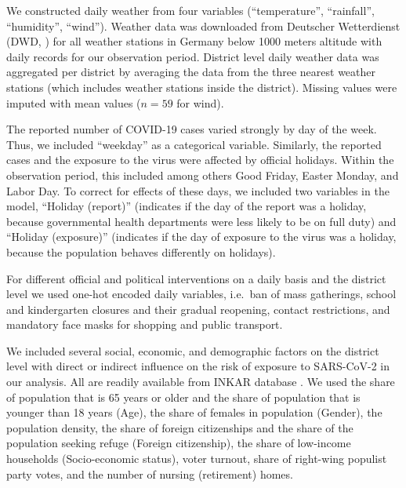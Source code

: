 \documentclass[]{elsarticle} %
\begin{document}
We constructed daily weather from four variables (``temperature'', ``rainfall'', ``humidity'', ``wind''). Weather data was downloaded from Deutscher Wetterdienst (DWD, \citep{dwd_weather}) for all weather stations in Germany below 1000 meters altitude with daily records for our observation period. District level daily weather data was aggregated per district by averaging the data from the three nearest weather stations (which includes weather stations inside the district). Missing values were imputed with mean values (\(n=59\) for wind).

The reported number of COVID-19 cases varied strongly by day of the week. Thus, we included ``weekday'' as a categorical variable. Similarly, the reported cases and the exposure to the virus were affected by official holidays. Within the observation period, this included among others Good Friday, Easter Monday, and Labor Day. To correct for effects of these days, we included two variables in the model, ``Holiday (report)'' (indicates if the day of the report was a holiday, because governmental health departments were less likely to be on full duty) and ``Holiday (exposure)'' (indicates if the day of exposure to the virus was a holiday, because the population behaves differently on holidays).

For different official and political interventions on a daily basis and the district level we used one-hot encoded daily variables, i.e.~ban of mass gatherings, school and kindergarten closures and their gradual reopening, contact restrictions, and mandatory face masks for shopping and public transport.

We included several social, economic, and demographic factors on the district level with direct or indirect influence on the risk of exposure to SARS-CoV-2 in our analysis. All are readily available from INKAR database \citep{inkar}. We used the share of population that is 65 years or older and the share of population that is younger than 18 years (Age), the share of females in population (Gender), the population density, the share of foreign citizenships and the share of the population seeking refuge (Foreign citizenship), the share of low-income households (Socio-economic status), voter turnout, share of right-wing populist party votes, and the number of nursing (retirement) homes.
\end{document}

